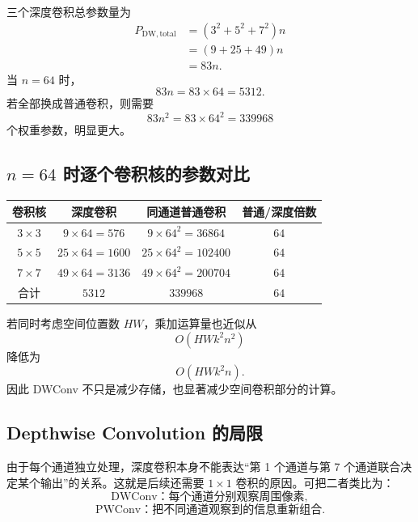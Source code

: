\documentclass[UTF8,12pt,a4paper,fontset=none]{ctexart}
\begin{document}
三个深度卷积总参数量为
\begin{align}
 P_{\mathrm{DW,total}}
 &=(3^2+5^2+7^2)n\\
 &=(9+25+49)n\\
 &=83n.
\end{align}
当 $n=64$ 时，
\begin{equation}
 83n=83\times64=5312.
\end{equation}
若全部换成普通卷积，则需要
\begin{equation}
 83n^2=83\times64^2=339968
\end{equation}
个权重参数，明显更大。



\subsection{\texorpdfstring{$n=64$}{n=64} 时逐个卷积核的参数对比}

\begin{center}
\begin{tabular}{cccc}
\toprule
卷积核 & 深度卷积 & 同通道普通卷积 & 普通/深度倍数\\
\midrule
$3\times3$ & $9\times64=576$ & $9\times64^2=36864$ & $64$\\
$5\times5$ & $25\times64=1600$ & $25\times64^2=102400$ & $64$\\
$7\times7$ & $49\times64=3136$ & $49\times64^2=200704$ & $64$\\
\midrule
合计 & $5312$ & $339968$ & $64$\\
\bottomrule
\end{tabular}
\end{center}

若同时考虑空间位置数 $HW$，乘加运算量也近似从
\begin{equation}
 O(HWk^2n^2)
\end{equation}
降低为
\begin{equation}
 O(HWk^2n).
\end{equation}
因此 DWConv 不只是减少存储，也显著减少空间卷积部分的计算。

\subsection{Depthwise Convolution 的局限}

由于每个通道独立处理，深度卷积本身不能表达“第 1 个通道与第 7 个通道联合决定某个输出”的关系。这就是后续还需要 $1\times1$ 卷积的原因。可把二者类比为：
\begin{equation}
 \text{DWConv：每个通道分别观察周围像素},
\end{equation}
\begin{equation}
 \text{PWConv：把不同通道观察到的信息重新组合}.
\end{equation}
\end{document}
